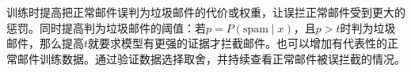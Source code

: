训练时提高把正常邮件误判为垃圾邮件的代价或权重，让误拦正常邮件受到更大的惩罚。同时提高判为垃圾邮件的阈值：若\(p=P(\mathrm{spam}\mid x)\)，且\(p>t\)时判为垃圾邮件，那么提高\(t\)就要求模型有更强的证据才拦截邮件。也可以增加有代表性的正常邮件训练数据。通过验证数据选择取舍，并持续查看正常邮件被误拦截的情况。
